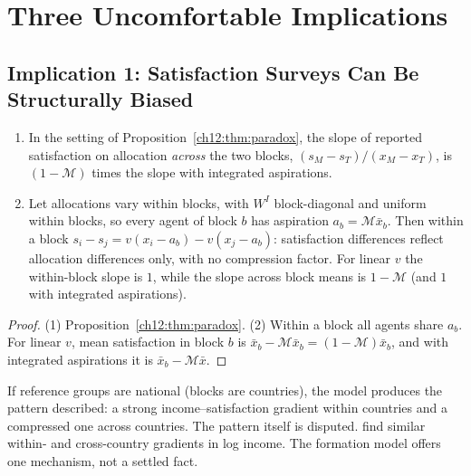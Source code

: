 \documentclass[../structural_economics_book.tex]{subfiles}
\begin{document}
\section{Three Uncomfortable Implications}
\label{ch12:sec:implications}

\subsection{Implication 1: Satisfaction Surveys Can Be Structurally Biased}

\begin{corollary}\label{ch12:prop:satisfaction}
\begin{enumerate}
\item In the setting of Proposition~\ref{ch12:thm:paradox}, the slope of reported satisfaction on allocation \textit{across} the two blocks, $(s_M - s_T)/(x_M - x_T)$, is $(1 - \mathcal{M})$ times the slope with integrated aspirations.
\item Let allocations vary within blocks, with $W^I$ block-diagonal and uniform within blocks, so every agent of block $b$ has aspiration $a_b = \mathcal{M}\bar{x}_b$. Then within a block $s_i - s_j = v(x_i - a_b) - v(x_j - a_b)$: satisfaction differences reflect allocation differences only, with no compression factor. For linear $v$ the within-block slope is $1$, while the slope across block means is $1 - \mathcal{M}$ (and $1$ with integrated aspirations).
\end{enumerate}
\end{corollary}

\begin{proof}
(1) Proposition~\ref{ch12:thm:paradox}. (2) Within a block all agents share $a_b$. For linear $v$, mean satisfaction in block $b$ is $\bar{x}_b - \mathcal{M}\bar{x}_b = (1 - \mathcal{M})\bar{x}_b$, and with integrated aspirations it is $\bar{x}_b - \mathcal{M}\bar{x}$.
\end{proof}

If reference groups are national (blocks are countries), the model produces the pattern \citet{easterlin1974does} described: a strong income--satisfaction gradient within countries and a compressed one across countries. The pattern itself is disputed. \citet{stevenson2008economic} find similar within- and cross-country gradients in log income. The formation model offers one mechanism, not a settled fact.
\end{document}
